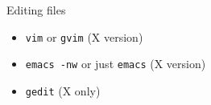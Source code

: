 \begin{frame}{Editing files}
  \begin{itemize}
  \item \texttt{vim} or \texttt{gvim} (X version)
  \item \texttt{emacs -nw} or just \texttt{emacs} (X version)
  \item \texttt{gedit} (X only)
  \end{itemize}
\end{frame}
